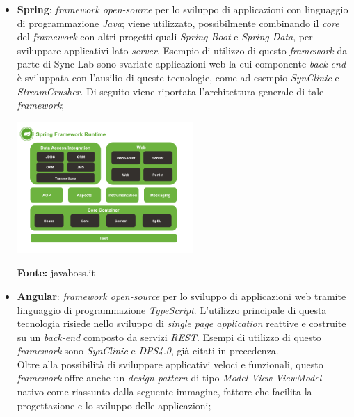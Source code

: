 \begin{itemize}
  \item \textbf{Spring}: \textit{framework open-source} per lo sviluppo di applicazioni con linguaggio di programmazione \textit{Java}; viene utilizzato, possibilmente combinando il \textit{core} del \textit{framework} con altri progetti quali \textit{Spring Boot} e \textit{Spring Data}, per sviluppare applicativi lato \textit{server}. Esempio di utilizzo di questo \textit{framework} da parte di Sync Lab sono svariate applicazioni web la cui componente \textit{back-end} è sviluppata con l'ausilio di queste tecnologie, come ad esempio \textit{SynClinic} e \textit{StreamCrusher}. Di seguito viene riportata l'architettura generale di tale \textit{framework};

  \begin{minipage}{\linewidth}
    \centering
      \includegraphics[height=5cm]{immagini/spring}
    \caption*{\textbf{Fonte:} javaboss.it}
  \end{minipage}

  \item \textbf{Angular}: \textit{framework open-source} per lo sviluppo di applicazioni web tramite linguaggio di programmazione \textit{TypeScript}. L'utilizzo principale di questa tecnologia risiede nello sviluppo di \textit{single page application} reattive e costruite su un \textit{back-end} composto da servizi \textit{REST}. Esempi di utilizzo di questo \textit{framework} sono \textit{SynClinic} e \textit{DPS4.0}, già citati in precedenza. \\
  Oltre alla possibilità di sviluppare applicativi veloci e funzionali, questo \textit{framework} offre anche un \textit{design pattern} di tipo \textit{Model-View-ViewModel} nativo come riassunto dalla seguente immagine, fattore che facilita la progettazione e lo sviluppo delle applicazioni;


\end{itemize}
